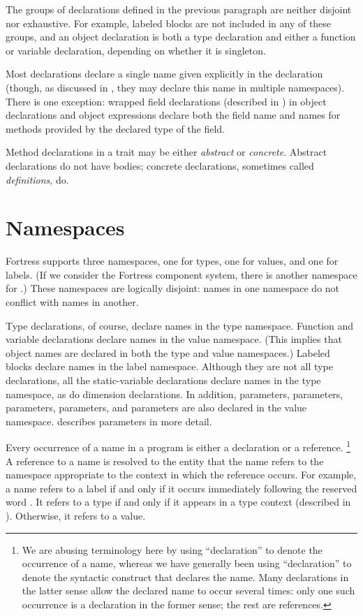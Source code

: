 The groups of declarations defined in the previous paragraph
are neither disjoint nor exhaustive.
For example, labeled blocks are not included in any of these groups, and
an object declaration is both a type declaration
and either a function or variable declaration,
depending on whether it is singleton.

Most declarations declare a single name
given explicitly in the declaration
(though, as discussed in ,
they may declare this name in multiple namespaces).
There is one exception:
wrapped field declarations (described in )
in object declarations and object expressions declare both the field name
and names for methods provided
by the declared type of the field.

Method declarations in a trait may be either
\emph{abstract} or \emph{concrete}.
Abstract declarations do not have bodies;
concrete declarations, sometimes called \emph{definitions}, do.


\section{Namespaces}

Fortress supports three namespaces,
one for types, one for values, and one for labels.
(If we consider the Fortress component system,
there is another namespace for \apisN.)
These namespaces are logically disjoint:
names in one namespace do not conflict
with names in another.

Type declarations, of course,
declare names in the type namespace.
Function and variable declarations declare names
in the value namespace.
(This implies that object names
are declared in both the type and value namespaces.)
Labeled blocks declare names in the label namespace.
Although they are not all type declarations,
all the static-variable declarations declare names
in the type namespace, as do dimension declarations.
In addition,
 parameters,
 parameters,
 parameters,
 parameters, and
 parameters
are also declared in the value namespace.
 describes
 parameters in more detail.

Every occurrence of a name in a program
is either a declaration or a reference.
\footnote{We are abusing terminology here
by using ``declaration'' to denote
the occurrence of a name,
whereas we have generally been using ``declaration''
to denote the syntactic construct that declares the name.
Many declarations in the latter sense
allow the declared name to occur several times:
only one such occurrence is a declaration in the former sense;
the rest are references.}
A reference to a name is resolved to
the entity that the name refers to the namespace
appropriate to the context
in which the reference occurs.
For example, a name refers to a label
if and only if it occurs immediately following
the reserved word .
It refers to a type if and only if it appears in a type context
(described in ).
Otherwise, it refers to a value.


